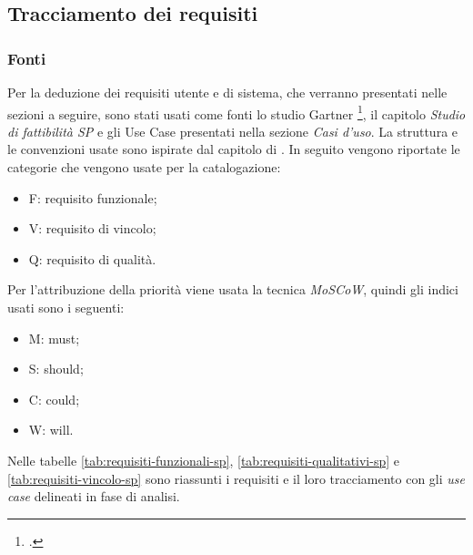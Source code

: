 \subsection{Tracciamento dei requisiti}
\subsubsection{Fonti}
Per la deduzione dei requisiti utente e di sistema, che verranno presentati nelle sezioni a seguire, sono stati usati come fonti lo studio Gartner \footcite{farah:The-Dawn-of-Decentralized-Identity}, il capitolo \emph{Studio di fattibilità SP} e gli Use Case presentati nella sezione \emph{Casi d'uso}. La struttura e le convenzioni usate sono ispirate dal capitolo di \cite{som:swe}. In seguito vengono riportate le categorie che vengono usate per la catalogazione:
\begin{itemize}
    \item F: requisito funzionale;
    \item V: requisito di vincolo;
    \item Q: requisito di qualità.
\end{itemize}
    
Per l’attribuzione della priorità viene usata la tecnica \textit{MoSCoW}, quindi gli indici usati sono i seguenti:
\begin{itemize}
    \item M: must;
    \item S: should; 
    \item C: could; 
    \item W: will.
\end{itemize} 
    
Nelle tabelle \ref{tab:requisiti-funzionali-sp}, \ref{tab:requisiti-qualitativi-sp} e \ref{tab:requisiti-vincolo-sp} sono riassunti i requisiti e il loro tracciamento con gli \textit{use case} delineati in fase di analisi.

